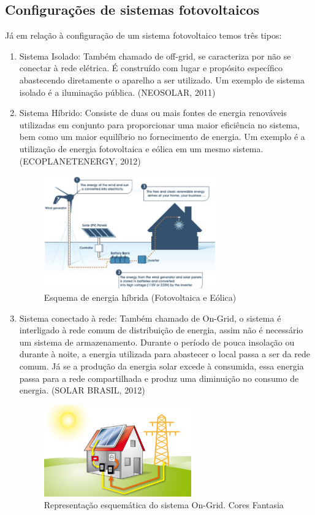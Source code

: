 \subsection{Configurações de sistemas fotovoltaicos}
Já em relação à configuração de um sistema fotovoltaico temos três tipos:
\begin{enumerate}
\item Sistema Isolado: Também chamado de off-grid, se caracteriza por não se conectar à rede elétrica. É construído com lugar e propósito específico abastecendo diretamente o aparelho a ser utilizado. Um exemplo de sistema isolado é a iluminação pública. (NEOSOLAR, 2011)
\item Sistema Híbrido: Consiste de duas ou mais fontes de energia renováveis utilizadas em conjunto para proporcionar uma maior eficiência no sistema, bem como um maior equilíbrio no fornecimento de energia.  Um exemplo é a utilização de energia fotovoltaica e eólica em um mesmo sistema. (ECOPLANETENERGY, 2012)

\begin{figure}[!h]
\centering
\includegraphics[width=0.7\textwidth]{figuras/esquema.png}
\caption{Esquema de energia híbrida (Fotovoltaica e Eólica)}
\end{figure}

\item Sistema conectado à rede: Também chamado de On-Grid, o sistema é interligado à rede comum de distribuição de energia, assim não é necessário um sistema de armazenamento. Durante o período de pouca insolação ou durante à noite, a energia utilizada para abastecer o local passa a ser da rede comum. Já se a produção da energia solar excede à consumida, essa energia passa para a rede compartilhada e produz uma diminuição no consumo de energia. (SOLAR BRASIL, 2012)

\begin{figure}[h]
\centering
\includegraphics[width=0.6\textwidth]{figuras/ongrid.png}
\caption{Representação esquemática do sistema On-Grid. Cores Fantasia}
\end{figure}
\end{enumerate}

